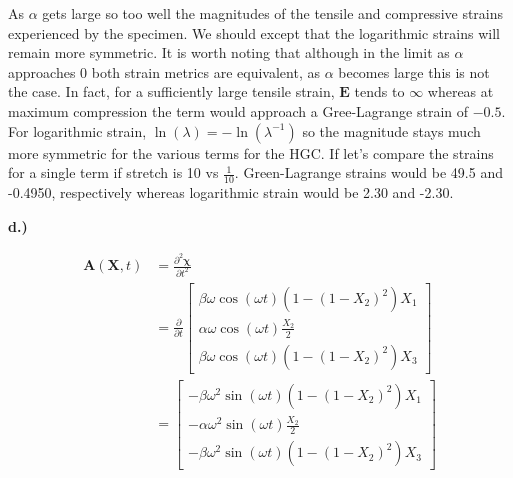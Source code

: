 As $\alpha$ gets large so too well the magnitudes of the tensile and compressive strains experienced by the specimen. We should except that the logarithmic strains will remain more symmetric. It is worth noting that although in the limit as $\alpha$ approaches $0$ both strain metrics are equivalent, as $\alpha$ becomes large this is not the case. In fact, for a sufficiently large tensile strain, $\mathbf{E}$ tends to $\infty$ whereas at maximum compression the term would approach a Gree-Lagrange strain of $-0.5$. For logarithmic strain, $\ln(\lambda) = -\ln(\lambda^{-1})$ so the magnitude stays much more symmetric for the various terms for the HGC. If let's compare the strains for a single term if stretch is 10 vs $\frac{1}{10}$. Green-Lagrange strains would be 49.5 and -0.4950, respectively whereas logarithmic strain would be 2.30 and -2.30. 

\textbf{d.)}

\begin{align*}
\mathbf{A}(\mathbf{X},t) &= \frac{\partial^2\mathbf{\chi}}{\partial t^2} \\
&= \frac{\partial}{\partial t} \begin{bmatrix}
    \beta\omega\cos(\omega t)(1-(1-X_2)^2)X_1 \\ \alpha\omega\cos(\omega t)\frac{X_2}{2} \\
    \beta\omega\cos(\omega t)(1-(1-X_2)^2)X_3
\end{bmatrix} \\
&= \begin{bmatrix}
    -\beta\omega^2\sin(\omega t)(1-(1-X_2)^2)X_1 \\ -\alpha\omega^2\sin(\omega t)\frac{X_2}{2} \\
    -\beta\omega^2\sin(\omega t)(1-(1-X_2)^2)X_3
\end{bmatrix}
\end{align*}